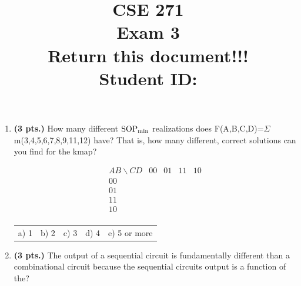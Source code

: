 \documentclass{article}
\begin{document}
\newcommand{\SOPmin}{${\rm SOP}_{\rm min} \ $}
\newcommand{\POSmin}{${\rm POS}_{\rm min} \ $}
\newcommand{\bs}{\backslash}
\newcommand{\x}{\addtocounter{enumi}{1} \theenumi}


\title{
\Huge{CSE 271}\\
\normalsize{Exam 3}\\
\normalsize{Return this document!!!}\\
Student ID:}
\date{}

\maketitle{}

\begin{enumerate}
\item {\bf (3 pts.)} How many different \SOPmin realizations does 
F(A,B,C,D)=$\Sigma$m(3,4,5,6,7,8,9,11,12) have?  That is, how many 
different, correct solutions can you find for the kmap?

$$ \begin{array} {c||c|c|c|c}
        AB \bs CD & 00 & 01 & 11 & 10 \\ \hline \hline
        00        &    &    &    &    \\ \hline
        01        &    &    &    &    \\ \hline
        11        &    &    &    &    \\ \hline
        10        &    &    &    &    \\
\end{array} $$ 

\begin{tabular}{p{0.75in}p{0.75in}p{0.75in}p{0.75in}p{0.75in}}
a) 1 & b) 2 & c) 3 & d) 4 & e) 5 or more \\
\end{tabular}

\item {\bf (3 pts.)} The output of a sequential circuit is fundamentally
different than a combinational circuit because the sequential circuits 
output is a function of the?


\end{enumerate}
\end{document}
